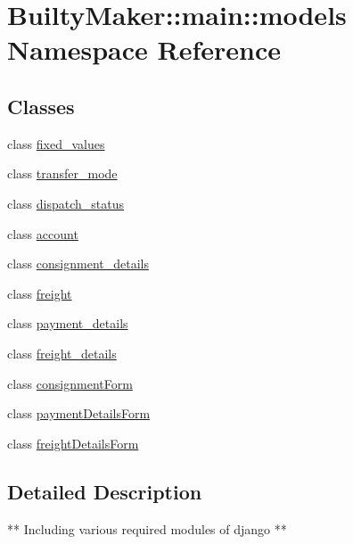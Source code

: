 \hypertarget{namespaceBuiltyMaker_1_1main_1_1models}{\section{\-Builty\-Maker\-:\-:main\-:\-:models \-Namespace \-Reference}
\label{namespaceBuiltyMaker_1_1main_1_1models}
}
\subsection*{\-Classes}
\begin{DoxyCompactItemize}
\item 
class \hyperlink{classBuiltyMaker_1_1main_1_1models_1_1fixed__values}{fixed\-\_\-values}
\item 
class \hyperlink{classBuiltyMaker_1_1main_1_1models_1_1transfer__mode}{transfer\-\_\-mode}
\item 
class \hyperlink{classBuiltyMaker_1_1main_1_1models_1_1dispatch__status}{dispatch\-\_\-status}
\item 
class \hyperlink{classBuiltyMaker_1_1main_1_1models_1_1account}{account}
\item 
class \hyperlink{classBuiltyMaker_1_1main_1_1models_1_1consignment__details}{consignment\-\_\-details}
\item 
class \hyperlink{classBuiltyMaker_1_1main_1_1models_1_1freight}{freight}
\item 
class \hyperlink{classBuiltyMaker_1_1main_1_1models_1_1payment__details}{payment\-\_\-details}
\item 
class \hyperlink{classBuiltyMaker_1_1main_1_1models_1_1freight__details}{freight\-\_\-details}
\item 
class \hyperlink{classBuiltyMaker_1_1main_1_1models_1_1consignmentForm}{consignment\-Form}
\item 
class \hyperlink{classBuiltyMaker_1_1main_1_1models_1_1paymentDetailsForm}{payment\-Details\-Form}
\item 
class \hyperlink{classBuiltyMaker_1_1main_1_1models_1_1freightDetailsForm}{freight\-Details\-Form}
\end{DoxyCompactItemize}


\subsection{\-Detailed \-Description}
\begin{DoxyVerb}
    ** Including various required modules of django **
\end{DoxyVerb}
 